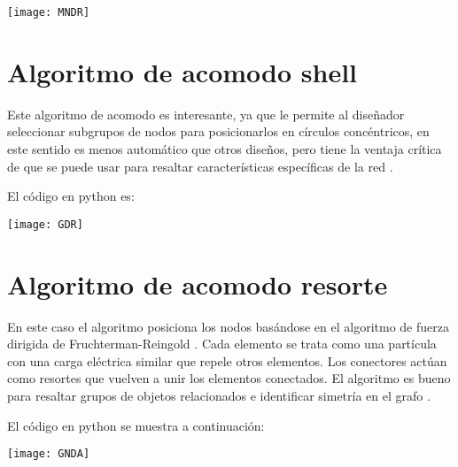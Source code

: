 \documentclass[10pt,a4paper]{article}
\begin{document}
\begin{center}

\texttt{[image: MNDR]}

\end{center}

\section{Algoritmo de acomodo shell}

Este algoritmo de acomodo es interesante, ya que le permite al diseñador seleccionar subgrupos de nodos para posicionarlos en círculos concéntricos, en este sentido es menos automático que otros diseños, pero tiene la ventaja crítica de que se puede usar para resaltar características específicas de la red \cite{g}.\newpage

El código en python es:



\begin{center}

\texttt{[image: GDR]}

\end{center}

\section{Algoritmo de acomodo resorte}

En este caso el algoritmo posiciona los nodos basándose en el algoritmo de fuerza dirigida de Fruchterman-Reingold \cite{h}. Cada elemento se trata como una partícula con una carga eléctrica similar que repele otros elementos. Los conectores actúan como resortes que vuelven a unir los elementos conectados. El algoritmo es bueno para resaltar grupos de objetos relacionados e identificar simetría en el grafo \cite{i}.\vspace{.4cm}

El código en python se muestra a continuación:



\begin{center}

\texttt{[image: GNDA]}

\end{center}
\end{document}
